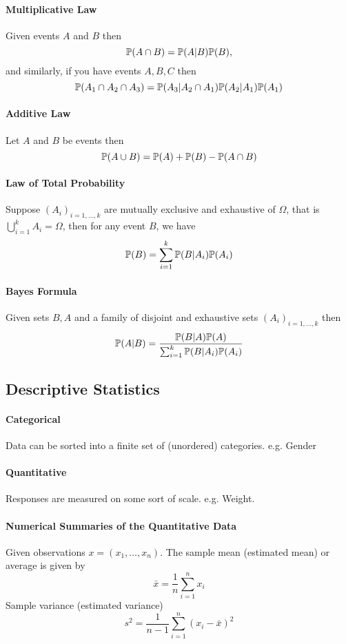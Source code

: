 \paragraph{Multiplicative Law}
Given events \(A\) and \(B\) then
\[\mathbb{P}(A \cap B) = \mathbb{P}(A|B)\mathbb{P}(B),\]
and similarly, if you have events \(A, B, C\) then
\[\mathbb{P}(A_1 \cap A_2 \cap A_3) = \mathbb{P}(A_3 | A_2 \cap A_1)\mathbb{P}(A_2|A_1)\mathbb{P}(A_1)\]

\paragraph{Additive Law}
Let \(A\) and \(B\) be events then
\[\mathbb{P}(A \cup B) = \mathbb{P}(A) + \mathbb{P}(B) - \mathbb{P}(A \cap B)\]

\paragraph{Law of Total Probability}
Suppose \((A_i)_{i=1,\dots,k}\) are mutually exclusive and exhaustive of \(\Omega\), that is \(\bigcup_{i=1}^k A_i = \Omega\), then for any event \(B\), we have 
\[\mathbb{P}(B) = \sum_{i=1}^k \mathbb{P}(B|A_i)\mathbb{P}(A_i)\]

\paragraph{Bayes Formula}
Given sets \(B, A\) and a family of disjoint and exhaustive sets \((A_i)_{i=1,\dots,k}\) then
\[\mathbb{P}(A|B) = \frac{\mathbb{P}(B|A)\mathbb{P}(A)}{\sum_{i=1}^k \mathbb{P}(B|A_i)\mathbb{P}(A_i)}\]

\subsection{Descriptive Statistics}
\paragraph{Categorical}
Data can be sorted into a finite set of (unordered) categories. e.g. Gender

\paragraph{Quantitative}
Responses are measured on some sort of scale. e.g. Weight.

\paragraph{Numerical Summaries of the Quantitative Data}
Given observations \(x = (x_1, \dots, x_n)\). The sample mean (estimated mean) or average is given by 
\[\bar{x} = \frac{1}{n}\sum_{i=1}^n x_i\]
Sample variance (estimated variance)
\[s^2 = \frac{1}{n-1}\sum_{i=1}^n (x_i - \bar{x})^2\]